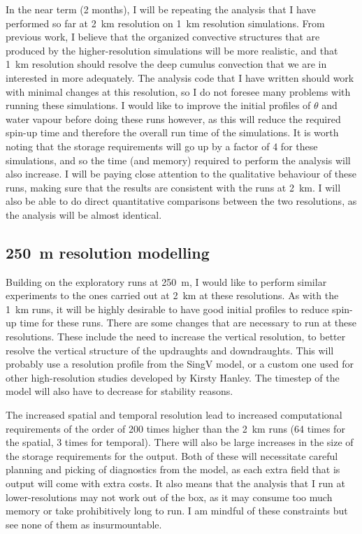\documentclass[11pt,a4paper]{article}
\begin{document}
In the near term (2 months), I will be repeating the analysis that I have performed so far at \SI{2}{km} resolution on \SI{1}{km} resolution simulations. From previous work, I believe that the organized convective structures that are produced by the higher-resolution simulations will be more realistic, and that \SI{1}{km} resolution should resolve the deep cumulus convection that we are in interested in more adequately. The analysis code that I have written should work with minimal changes at this resolution, so I do not foresee many problems with running these simulations. I would like to improve the initial profiles of $\theta$ and water vapour before doing these runs however, as this will reduce the required spin-up time and therefore the overall run time of the simulations. It is worth noting that the storage requirements will go up by a factor of 4 for these simulations, and so the time (and memory) required to perform the analysis will also increase. I will be paying close attention to the qualitative behaviour of these runs, making sure that the results are consistent with the runs at \SI{2}{km}. I will also be able to do direct quantitative comparisons between the two resolutions, as the analysis will be almost identical.

\subsection{\SI{250}{m} resolution modelling}
\label{sec:250m_res}

Building on the exploratory runs at \SI{250}{m}, I would like to perform similar experiments to the ones carried out at \SI{2}{km} at these resolutions. As with the \SI{1}{km} runs, it will be highly desirable to have good initial profiles to reduce spin-up time for these runs. There are some changes that are necessary to run at these resolutions. These include the need to increase the vertical resolution, to better resolve the vertical structure of the updraughts and downdraughts. This will probably use a resolution profile from the SingV model, or a custom one used for other high-resolution studies developed by Kirsty Hanley. The timestep of the model will also have to decrease for stability reasons. 

The increased spatial and temporal resolution lead to increased computational requirements of the order of 200 times higher than the \SI{2}{km} runs (64 times for the spatial, 3 times for temporal). There will also be large increases in the size of the storage requirements for the output. Both of these will necessitate careful planning and picking of diagnostics from the model, as each extra field that is output will come with extra costs. It also means that the analysis that I run at lower-resolutions may not work out of the box, as it may consume too much memory or take prohibitively long to run. I am mindful of these constraints but see none of them as insurmountable.
\end{document}

